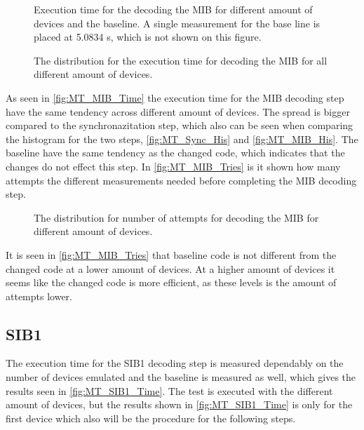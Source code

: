 \captionsetup{belowskip=0em}
\begin{minipage}{0.48\textwidth}
\begin{figure}[H]
\centering
\resizebox{0.9\textwidth}{!}{
}
\caption{Execution time for the decoding the MIB for different amount of devices and the baseline. A single measurement for the base line is placed at 5.0834 s, which is not shown on this figure.}
\label{fig:MT_MIB_Time}
\end{figure}
\end{minipage}%
\hfill
\begin{minipage}{0.48\textwidth}
\begin{figure}[H]
\centering
\resizebox{0.9\textwidth}{!}{
}
\caption{The distribution for the execution time for decoding the MIB for all different amount of devices.}
\label{fig:MT_MIB_His}
\end{figure}
\end{minipage}
\captionsetup{belowskip=-1.5em}

As seen in \autoref{fig:MT_MIB_Time} the execution time for the MIB decoding step have the same tendency across different amount of devices. The spread is bigger compared to the synchronazitation step, which also can be seen when comparing the histogram for the two steps, \autoref{fig:MT_Sync_His} and \autoref{fig:MT_MIB_His}. The baseline have the same tendency as the changed code, which indicates that the changes do not effect this step. In \autoref{fig:MT_MIB_Tries} is it shown how many attempts the different measurements needed before completing the MIB decoding step.

\begin{figure}[H]
\centering
\resizebox{0.5\textwidth}{!}{
}
\caption{The distribution for number of attempts for decoding the MIB for different amount of devices.}
\label{fig:MT_MIB_Tries}
\end{figure}

It is seen in \autoref{fig:MT_MIB_Tries} that baseline code is not different from the changed code at a lower amount of devices. At a higher amount of devices it seems like the changed code is more efficient, as these levels is the amount of attempts lower.

\subsection{SIB1}
The execution time for the SIB1 decoding step is measured dependably on the number of devices emulated and the baseline is measured as well, which gives the results seen in \autoref{fig:MT_SIB1_Time}. The test is executed with the different amount of devices, but the results shown in \autoref{fig:MT_SIB1_Time} is only for the first device which also will be the procedure for the following steps. 

